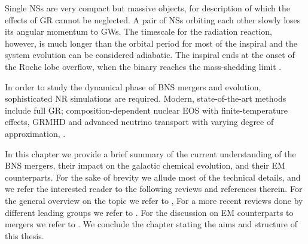 Single \acp{NS} are very compact but massive objects, 
for description of which the effects of \ac{GR} cannot be neglected.
A pair of \acp{NS} orbiting each other slowly loses its 
angular momentum to \acp{GW}. The timescale for the radiation reaction, however, 
is much longer than the orbital period for most of the inspiral and the 
system evolution can be considered adiabatic. 
The inspiral ends at the onset of the Roche lobe overflow, when the binary 
reaches the mass-shedding limit \citep{Bejger:2004zx}.

In order to study the dynamical phase of \ac{BNS} mergers and \pmerg{} evolution, 
sophisticated \ac{NR} simulations are required. Modern, state-of-the-art methods 
include full \ac{GR}; composition-dependent nuclear \ac{EOS} with finite-temperature 
effects, \ac{GRMHD} and advanced neutrino transport with varying degree of approximation,
\citep{Sekiguchi:2011zd,Wanajo:2014wha,Foucart:2015gaa,Palenzuela:2015dqa,Sekiguchi:2016bjd,Kiuchi:2017zzg,Radice:2017zta,Fujibayashi:2017puw}.


In this chapter we provide a brief summary of the current understanding of the 
\ac{BNS} mergers, their impact on the galactic chemical evolution, and their 
\ac{EM} counterparts. For the sake of brevity we allude most of the technical details, 
and we refer the interested reader to the following reviews and references therein.
%
For the general overview on the topic we refer to \citet{Shibata:2016},
For a more recent reviews done by different leading groups we refer to 
\citet{Radice:2020ddv,Bernuzzi:2020tgt,Shibata:2019wef}.
%
For the discussion on \ac{EM} counterparts to mergers we refer to 
\citet{Kumar:2014upa,Fernandez:2015use,Metzger:2019zeh}.
%
We conclude the chapter stating the aims and structure of this thesis.

